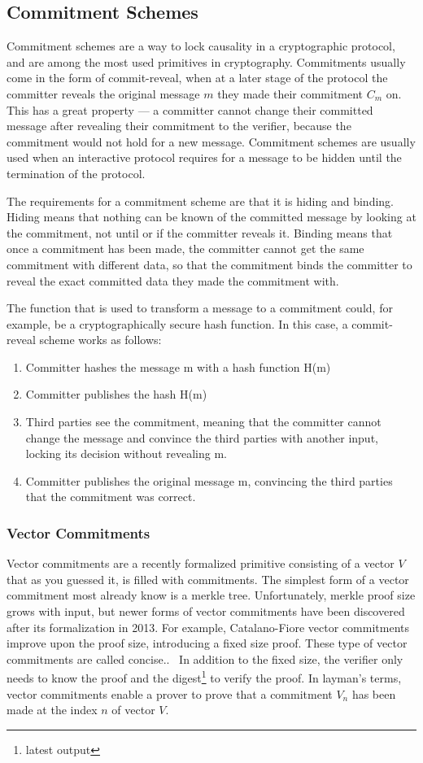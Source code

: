 \subsection{Commitment Schemes}
Commitment schemes are a way to lock causality in a cryptographic protocol, and are among the most used primitives in cryptography. Commitments usually come in the form of commit-reveal, when at a later stage of the protocol the committer reveals the original message \(m\) they made their commitment \(C_m\) on. This has a great property --- a committer cannot change their committed message after revealing their commitment to the verifier, because the commitment would not hold for a new message. Commitment schemes are usually used when an interactive protocol requires for a message to be hidden until the termination of the protocol.

The requirements for a commitment scheme are that it is hiding and binding. Hiding means that nothing can be known of the committed message by looking at the commitment, not until or if the committer reveals it. Binding means that once a commitment has been made, the committer cannot get the same commitment with different data, so that the commitment binds the committer to reveal the exact committed data they made the commitment with.

The function that is used to transform a message to a commitment could, for example, be a cryptographically secure hash function. In this case, a commit-reveal scheme works as follows:

\begin{enumerate}
  \item Committer hashes the message m with a hash function H(m)
  \item Committer publishes the hash H(m)
  \item Third parties see the commitment, meaning that the committer cannot change the message and convince the third parties with another input, locking its decision without revealing m.
  \item Committer publishes the original message m, convincing the third parties that the commitment was correct.
\end{enumerate}


\subsubsection{Vector Commitments}
Vector commitments are a recently formalized primitive consisting of a vector \(V\) that as you guessed it, is filled with commitments. The simplest form of a vector commitment most already know is a merkle tree. Unfortunately, merkle proof size grows with input, but newer forms of vector commitments have been discovered after its formalization in 2013. For example, Catalano-Fiore vector commitments improve upon the proof size, introducing a fixed size proof. These type of vector commitments are called concise..~\cite{Catalano2013-jn} In addition to the fixed size, the verifier only needs to know the proof and the digest\footnote{latest output} to verify the proof. In layman's terms, vector commitments enable a prover to prove that a commitment \(V_n\) has been made at the index \(n\) of vector \(V\).

